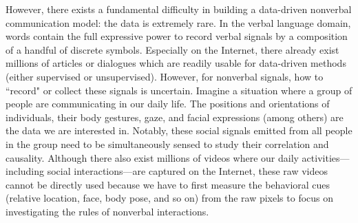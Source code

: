%


However, there exists a fundamental difficulty in building a data-driven nonverbal communication model: the data is extremely rare. In the verbal language domain, words contain the full expressive power to record verbal signals by a composition of a handful of discrete symbols. Especially on the Internet, there already exist millions of articles or dialogues which are readily usable for data-driven methods (either supervised or unsupervised). However, for nonverbal signals, how to ``record" or collect these signals is uncertain. Imagine a situation where a group of people are communicating in our daily life. The positions and orientations of individuals, their body gestures, gaze, and facial expressions (among others) are the data we are interested in. Notably, these social signals emitted from all people in the group need to be simultaneously sensed to study their correlation and causality. Although there also exist millions of videos where our daily activities---including social interactions---are captured on the Internet, these raw videos cannot be directly used because we have to first measure the behavioral cues (relative location, face, body pose, and so on) from the raw pixels to focus on investigating the rules of nonverbal interactions. %


